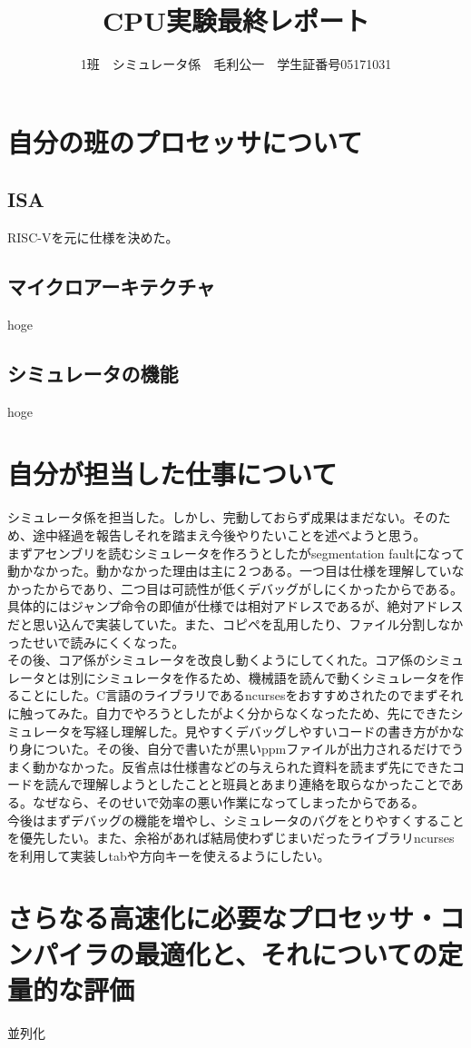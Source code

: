 \documentclass{jsarticle}
\begin{document}
\title{CPU実験最終レポート}
\author{1班　シミュレータ係　毛利公一　学生証番号05171031}
\maketitle

\section{自分の班のプロセッサについて}
\subsection{ISA}
RISC-Vを元に仕様を決めた。
\subsection{マイクロアーキテクチャ}
hoge
\subsection{シミュレータの機能}
hoge
\section{自分が担当した仕事について}
シミュレータ係を担当した。しかし、完動しておらず成果はまだない。そのため、途中経過を報告しそれを踏まえ今後やりたいことを述べようと思う。\\
まずアセンブリを読むシミュレータを作ろうとしたがsegmentation faultになって動かなかった。動かなかった理由は主に２つある。一つ目は仕様を理解していなかったからであり、二つ目は可読性が低くデバッグがしにくかったからである。具体的にはジャンプ命令の即値が仕様では相対アドレスであるが、絶対アドレスだと思い込んで実装していた。また、コピペを乱用したり、ファイル分割しなかったせいで読みにくくなった。\\
その後、コア係がシミュレータを改良し動くようにしてくれた。コア係のシミュレータとは別にシミュレータを作るため、機械語を読んで動くシミュレータを作ることにした。C言語のライブラリであるncursesをおすすめされたのでまずそれに触ってみた。自力でやろうとしたがよく分からなくなったため、先にできたシミュレータを写経し理解した。見やすくデバッグしやすいコードの書き方がかなり身についた。その後、自分で書いたが黒いppmファイルが出力されるだけでうまく動かなかった。反省点は仕様書などの与えられた資料を読まず先にできたコードを読んで理解しようとしたことと班員とあまり連絡を取らなかったことである。なぜなら、そのせいで効率の悪い作業になってしまったからである。\\
今後はまずデバッグの機能を増やし、シミュレータのバグをとりやすくすることを優先したい。また、余裕があれば結局使わずじまいだったライブラリncursesを利用して実装しtabや方向キーを使えるようにしたい。\\
\section{さらなる高速化に必要なプロセッサ・コンパイラの最適化と、それについての定量的な評価}
並列化
\end{document}
